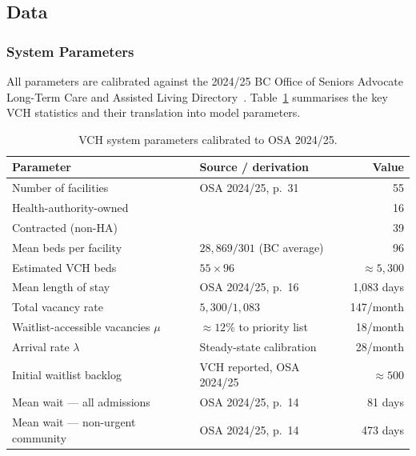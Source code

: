 %
%

\subsection{Data}
\label{sec:data}

\subsubsection*{System Parameters}

All parameters are calibrated against the 2024/25 BC Office of Seniors Advocate
Long-Term Care and Assisted Living Directory~\cite{ref9}.
Table~\ref{tab:vch_params} summarises the key VCH statistics and their translation
into model parameters.

\begin{table}[H]
\centering
\caption{VCH system parameters calibrated to OSA 2024/25.}
\label{tab:vch_params}
\begin{tabular}{llr}
\toprule
\textbf{Parameter} & \textbf{Source / derivation} & \textbf{Value} \\
\midrule
Number of facilities            & OSA 2024/25, p.\ 31              & 55 \\
\quad Health-authority-owned    &                                  & 16 \\
\quad Contracted (non-HA)       &                                  & 39 \\
Mean beds per facility          & $28{,}869 / 301$ (BC average)   & 96 \\
Estimated VCH beds              & $55 \times 96$                  & $\approx 5{,}300$ \\
Mean length of stay             & OSA 2024/25, p.\ 16             & 1{,}083 days \\
\midrule
Total vacancy rate              & $5{,}300 / 1{,}083$             & 147/month \\
Waitlist-accessible vacancies $\mu$ & $\approx 12\%$ to priority list & 18/month \\
Arrival rate $\lambda$          & Steady-state calibration        & 28/month \\
Initial waitlist backlog        & VCH reported, OSA 2024/25      & $\approx 500$ \\
\midrule
Mean wait --- all admissions      & OSA 2024/25, p.\ 14           & 81 days \\
Mean wait --- non-urgent community & OSA 2024/25, p.\ 14          & 473 days \\
\bottomrule
\end{tabular}
\end{table}

